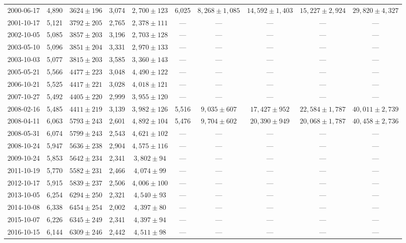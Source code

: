 \begin{landscape}
\begin{longtable}{cccccccccc}
{2000-06-17} & 4,890 & {$3624  \pm  196$} & 3,074 & {$2,700 \pm 123$} & 6,025 & {$8,268 \pm 1,085$} & {$14,592 \pm 1,403$} & {$15,227 \pm 2,924$} & {$29,820 \pm 4,327$} \\
{2001-10-17} & 5,121 & {$3792  \pm  205$} & 2,765 & {$2,378 \pm 111$} & --- & --- & --- & --- & --- \\
{2002-10-05} & 5,085 & {$3857  \pm  203$} & 3,196 & {$2,703 \pm 128$} & --- & --- & --- & --- & --- \\
{2003-05-10} & 5,096 & {$3851  \pm  204$} & 3,331 & {$2,970 \pm 133$} & --- & --- & --- & --- & --- \\
{2003-10-03} & 5,077 & {$3815  \pm  203$} & 3,585 & {$3,360 \pm 143$} & --- & --- & --- & --- & --- \\
{2005-05-21} & 5,566 & {$4477  \pm  223$} & 3,048 & {$4,490 \pm 122$} & --- & --- & --- & --- & --- \\
{2006-10-21} & 5,525 & {$4417  \pm  221$} & 3,028 & {$4,018 \pm 121$} & --- & --- & --- & --- & --- \\
{2007-10-27} & 5,492 & {$4405  \pm  220$} & 2,999 & {$3,955 \pm 120$} & --- & --- & --- & --- & --- \\
{2008-02-16} & 5,485 & {$4411  \pm  219$} & 3,139 & {$3,982 \pm 126$} & 5,516 & {$9,035 \pm 607$} & {$17,427 \pm 952$} & {$22,584 \pm 1,787$} & {$40,011 \pm 2,739$} \\
{2008-04-11} & 6,063 & {$5793  \pm  243$} & 2,601 & {$4,892 \pm 104$} & 5,476 & {$9,704 \pm 602$} & {$20,390 \pm 949$} & {$20,068 \pm 1,787$} & {$40,458 \pm 2,736$} \\
{2008-05-31} & 6,074 & {$5799  \pm  243$} & 2,543 & {$4,621 \pm 102$} & --- & --- & --- & --- & --- \\
{2008-10-24} & 5,947 & {$5636  \pm  238$} & 2,904 & {$4,575 \pm 116$} & --- & --- & --- & --- & --- \\
{2009-10-24} & 5,853 & {$5642  \pm  234$} & 2,341 & {$3,802 \pm 94$} & --- & --- & --- & --- & --- \\
{2011-10-19} & 5,770 & {$5582  \pm  231$} & 2,466 & {$4,074 \pm 99$} & --- & --- & --- & --- & --- \\
{2012-10-17} & 5,915 & {$5839  \pm  237$} & 2,506 & {$4,006 \pm 100$} & --- & --- & --- & --- & --- \\
{2013-10-05} & 6,254 & {$6294  \pm  250$} & 2,321 & {$4,540 \pm 93$} & --- & --- & --- & --- & --- \\
{2014-10-08} & 6,338 & {$6454  \pm  254$} & 2,002 & {$4,397 \pm 80$} & --- & --- & --- & --- & --- \\
{2015-10-07} & 6,226 & {$6345  \pm  249$} & 2,341 & {$4,397 \pm 94$} & --- & --- & --- & --- & --- \\
{2016-10-15} & 6,144 & {$6309  \pm  246$} & 2,442 & {$4,511 \pm 98$} & --- & --- & --- & --- & --- \\
\end{longtable} 
\end{landscape} 
